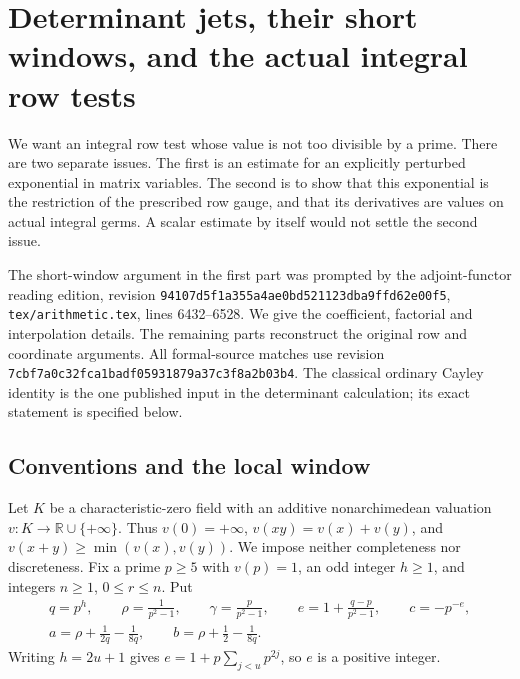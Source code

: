 \section{Determinant jets, their short windows, and the actual integral row tests}
\label{sec:determinant-jet-v057}


We want an integral row test whose value is not too divisible by a
prime.  There are two separate issues.  The first is an estimate for
an explicitly perturbed exponential in matrix variables.  The second
is to show that this exponential is the restriction of the prescribed
row gauge, and that its derivatives are values on actual integral
germs.  A scalar estimate by itself would not settle the second issue.

The short-window argument in the first part was prompted by the
adjoint-functor reading edition, revision
\texttt{94107d5f1a355a4ae0bd521123dba9ffd62e00f5},
\texttt{tex/arithmetic.tex}, lines 6432--6528.  We give the coefficient,
factorial and interpolation details.  The remaining parts reconstruct
the original row and coordinate arguments.  All formal-source matches
use revision
\texttt{7cbf7a0c32fca1badf05931879a37c3f8a2b03b4}.
The classical ordinary Cayley identity is the one published input in
the determinant calculation; its exact statement is specified below.

\subsection{Conventions and the local window}

Let $K$ be a characteristic-zero field with an additive
nonarchimedean valuation
$v:K\longrightarrow\mathbb R\cup\{+\infty\}$.
Thus $v(0)=+\infty$, $v(xy)=v(x)+v(y)$, and
$v(x+y)\ge\min(v(x),v(y))$.  We impose neither completeness nor
discreteness.  Fix a prime $p\ge5$ with $v(p)=1$, an odd integer
$h\ge1$, and integers $n\ge1$, $0\le r\le n$.  Put
\begin{gather}
 q=p^h,\qquad \rho=\frac1{p^2-1},\qquad
 \gamma=\frac p{p^2-1},\qquad
 e=1+\frac{q-p}{p^2-1},\qquad c=-p^{-e},\label{djw:parameters}\\
 a=\rho+\frac1{2q}-\frac1{8q},\qquad
 b=\rho+\frac12-\frac1{8q}.
 \label{djw:weights}
\end{gather}
Writing $h=2u+1$ gives
$e=1+p\sum_{j<u}p^{2j}$, so $e$ is a positive integer.

